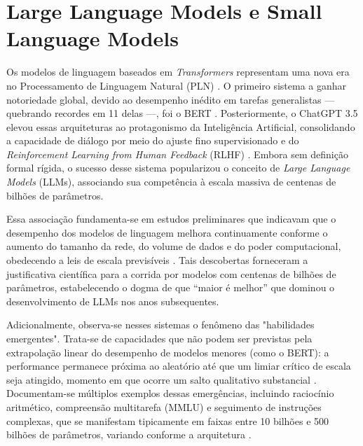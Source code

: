 \documentclass[
	12pt,				%
	openright,			%
	oneside,			%
	a4paper,			%
	dissertacao,			%
	]{ABNT-DC-UEL}
\begin{document}
\section{Large Language Models e Small Language Models}

Os modelos de linguagem baseados em \textit{Transformers} representam uma nova era no Processamento de Linguagem Natural (PLN) \cite{caseli2024}. O primeiro sistema a ganhar notoriedade global, devido ao desempenho inédito em tarefas generalistas — quebrando recordes em 11 delas —, foi o BERT \cite{devlin2019}. Posteriormente, o ChatGPT 3.5 elevou essas arquiteturas ao protagonismo da Inteligência Artificial, consolidando a capacidade de diálogo por meio do ajuste fino supervisionado e do \textit{Reinforcement Learning from Human Feedback} (RLHF) \cite{ouyang2022}. Embora sem definição formal rígida, o sucesso desse sistema popularizou o conceito de \textit{Large Language Models} (LLMs), associando sua competência à escala massiva de centenas de bilhões de parâmetros.

Essa associação fundamenta-se em estudos preliminares que indicavam que o desempenho dos modelos de linguagem melhora continuamente conforme o aumento do tamanho da rede, do volume de dados e do poder computacional, obedecendo a leis de escala previsíveis \cite{kaplan2020}. Tais descobertas forneceram a justificativa científica para a corrida por modelos com centenas de bilhões de parâmetros, estabelecendo o dogma de que “maior é melhor” que dominou o desenvolvimento de LLMs nos anos subsequentes.

Adicionalmente, observa-se nesses sistemas o fenômeno das "habilidades emergentes". Trata-se de capacidades que não podem ser previstas pela extrapolação linear do desempenho de modelos menores (como o BERT): a performance permanece próxima ao aleatório até que um limiar crítico de escala seja atingido, momento em que ocorre um salto qualitativo substancial \cite{wei2022emergent}. Documentam-se múltiplos exemplos dessas emergências, incluindo raciocínio aritmético, compreensão multitarefa (MMLU) e seguimento de instruções complexas, que se manifestam tipicamente em faixas entre 10 bilhões e 500 bilhões de parâmetros, variando conforme a arquitetura \cite{wei2022emergent,zhao2025}.
\end{document}

